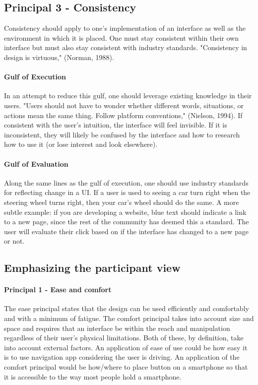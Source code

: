 \subsection{Principal 3 - Consistency}
Consistency should apply to one's implementation of an interface as well as the environment in which it is placed. One must stay consistent within their own interface but must also stay consistent with industry standards. "Consistency in design is virtuous," (Norman, 1988).

\paragraph{Gulf of Execution}
In an attempt to reduce this gulf, one should leverage existing knowledge in their users. "Users should not have to wonder whether different words, situations, or actions mean the same thing. Follow platform conventions," (Nielson, 1994). If consistent with the user's intuition, the interface will feel invisible. If it is inconsistent, they will likely be confused by the interface and how to research how to use it (or lose interest and look elsewhere).

\paragraph{Gulf of Evaluation}
Along the same lines as the gulf of execution, one should use industry standards for reflecting change in a UI. If a user is used to seeing a car turn right when the steering wheel turns right, then your car's wheel should do the same. A more subtle example: if you are developing a website, blue text should indicate a link to a new page, since the rest of the community has deemed this a standard. The user will evaluate their click based on if the interface has changed to a new page or not.


\subsection{Emphasizing the participant view}
\paragraph{Principal 1 - Ease and comfort}
The ease principal states that the design can be used efficiently and comfortably and with a minimum of fatigue. The comfort principal takes into account size and space and requires that an interface be within the reach and manipulation regardless of their user's physical limitations. Both of these, by definition, take into account external factors. An application of ease of use could be how easy it is to use navigation app considering the user is driving. An application of the comfort principal would be how/where to place button on a smartphone so that it is accessible to the way most people hold a smartphone.

